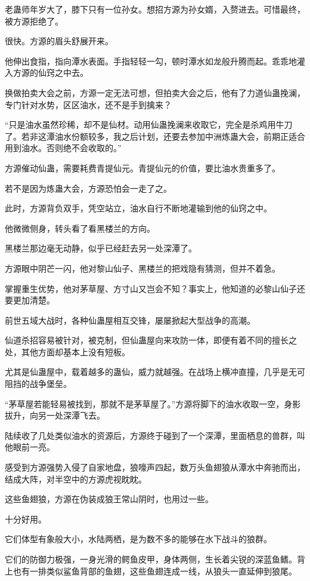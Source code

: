 \begin{this_body}
老蛊师年岁大了，膝下只有一位孙女。想招方源为孙女婿，入赘进去。可惜最终，被方源拒绝了。

很快。方源的眉头舒展开来。

他伸出食指，指向潭水表面。手指轻轻一勾，顿时潭水如龙般升腾而起。乖乖地灌入方源的仙窍之中去。

换做拍卖大会之前，方源一定无法可想，但拍卖大会之后，他有了力道仙蛊挽澜，专门针对水势，区区油水，还不是手到擒来？

“只是油水虽然珍稀，却不是仙材。动用仙蛊挽澜来收取它，完全是杀鸡用牛刀了。若非这潭油水份额较多，我之后计划，还要去参加中洲炼蛊大会，前期正适合用到油水。否则绝不会收取的。”

方源催动仙蛊，需要耗费青提仙元。青提仙元的价值，要比油水贵重多了。

若不是因为炼蛊大会，方源恐怕会一走了之。

此时，方源背负双手，凭空站立，油水自行不断地灌输到他的仙窍之中。

他微微侧身，转头看了看黑楼兰的方向。

黑楼兰那边毫无动静，似乎已经赶去另一处深潭了。

方源眼中阴芒一闪，他对黎山仙子、黑楼兰的把戏隐有猜测，但并不着急。

掌握重生优势，他对茅草屋、方寸山又岂会不知？事实上，他知道的必黎山仙子还要更加清楚。

前世五域大战时，各种仙蛊屋相互交锋，屡屡掀起大型战争的高潮。

仙道杀招容易被针对，被克制，但仙蛊屋向来攻防一体，即便有着不同的擅长之处，其他方面却基本上没有短板。

尤其是仙蛊屋中，载着越多的蛊仙，威力就越强。在战场上横冲直撞，几乎是无可阻挡的战争堡垒。

“茅草屋若能轻易被找到，那就不是茅草屋了。”方源将脚下的油水收取一空，身影拔升，向另一处深潭飞去。

陆续收了几处类似油水的资源后，方源终于碰到了一个深潭，里面栖息的兽群，叫他眼前一亮。

感受到方源强势入侵了自家地盘，狼嚎声四起，数万头鱼翅狼从潭水中奔驰而出，结成大阵，对半空中的方源虎视眈眈。

这些鱼翅狼，方源在伪装成狼王常山阴时，也用过一些。

十分好用。

它们体型有象般大小，水陆两栖，是为数不多的能够在水下战斗的狼群。

它们的防御力极强，一身光滑的鳄鱼皮甲，身体两侧，生长着尖锐的深蓝鱼鳍。背上也有一排类似鲨鱼背部的鱼翅，这些鱼翅连成一线，从狼头一直延伸到狼尾。


\end{this_body}
